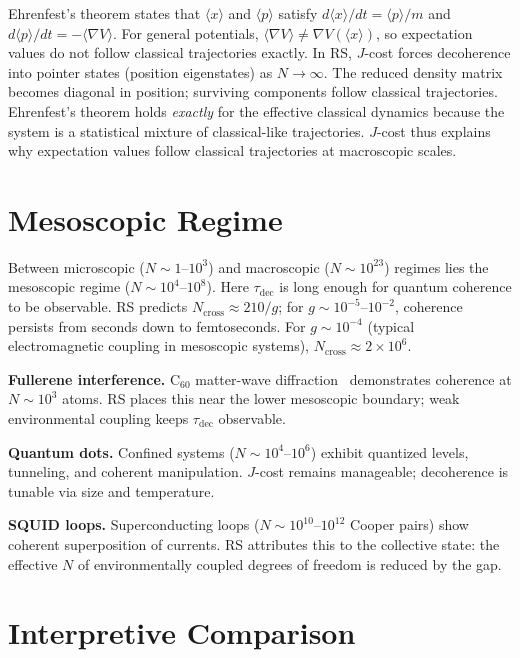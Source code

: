 \documentclass[12pt,a4paper]{article}
\theoremstyle{definition}
\theoremstyle{remark}
\begin{document}
Ehrenfest's theorem states that $\langle x \rangle$ and $\langle p
\rangle$ satisfy $d\langle x \rangle/dt = \langle p \rangle/m$ and
$d\langle p \rangle/dt = -\langle \nabla V \rangle$.  For general
potentials, $\langle \nabla V \rangle \neq \nabla V(\langle x
\rangle)$, so expectation values do not follow classical trajectories
exactly.  In RS, $J$-cost forces decoherence into pointer states
(position eigenstates) as $N \to \infty$.  The reduced density matrix
becomes diagonal in position; surviving components follow classical
trajectories.  Ehrenfest's theorem holds \emph{exactly} for the
effective classical dynamics because the system is a statistical
mixture of classical-like trajectories.  $J$-cost thus explains why
expectation values follow classical trajectories at macroscopic
scales.

\section{Mesoscopic Regime}

Between microscopic ($N \sim 1$--$10^3$) and macroscopic ($N \sim
10^{23}$) regimes lies the mesoscopic regime ($N \sim 10^4$--$10^8$).
Here $\tau_{\mathrm{dec}}$ is long enough for quantum coherence to be
observable.  RS predicts $N_{\mathrm{cross}} \approx 210/g$; for
$g \sim 10^{-5}$--$10^{-2}$, coherence persists from seconds down
to femtoseconds.  For $g \sim 10^{-4}$ (typical electromagnetic coupling
in mesoscopic systems), $N_{\mathrm{cross}} \approx 2 \times 10^6$.

\textbf{Fullerene interference.}  C$_{60}$ matter-wave
diffraction~\cite{Arndt} demonstrates coherence at $N \sim 10^3$
atoms.  RS places this near the lower mesoscopic boundary; weak
environmental coupling keeps $\tau_{\mathrm{dec}}$ observable.

\textbf{Quantum dots.}  Confined systems ($N \sim 10^4$--$10^6$)
exhibit quantized levels, tunneling, and coherent manipulation.
$J$-cost remains manageable; decoherence is tunable via size and
temperature.

\textbf{SQUID loops.}  Superconducting loops ($N \sim 10^{10}$--$10^{12}$
Cooper pairs) show coherent superposition of currents.  RS attributes
this to the collective state: the effective $N$ of environmentally
coupled degrees of freedom is reduced by the gap.

\section{Interpretive Comparison}
\end{document}
